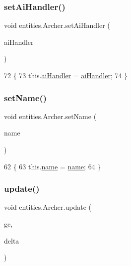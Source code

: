 \subsubsection{\texorpdfstring{set\+Ai\+Handler()}{setAiHandler()}}
{\footnotesize\ttfamily void entities.\+Archer.\+set\+Ai\+Handler (\begin{DoxyParamCaption}\item[{\mbox{\hyperlink{classentities_1_1_a_i_handler_basic}{A\+I\+Handler\+Basic}}}]{ai\+Handler }\end{DoxyParamCaption})\hspace{0.3cm}{\ttfamily [inline]}}


\begin{DoxyCode}
72                                                        \{
73         this.\mbox{\hyperlink{classentities_1_1_archer_a362254fb1ca99f07804647033ffe26d1}{aiHandler}} = \mbox{\hyperlink{classentities_1_1_archer_a362254fb1ca99f07804647033ffe26d1}{aiHandler}};
74     \}
\end{DoxyCode}
\mbox{\label{classentities_1_1_archer_a19c73121003b6704a0d082a51757ea91}} 
\subsubsection{\texorpdfstring{set\+Name()}{setName()}}
{\footnotesize\ttfamily void entities.\+Archer.\+set\+Name (\begin{DoxyParamCaption}\item[{String}]{name }\end{DoxyParamCaption})\hspace{0.3cm}{\ttfamily [inline]}}


\begin{DoxyCode}
62                                      \{
63         this.\mbox{\hyperlink{classentities_1_1_archer_a2c5680a0d628e5abbf69711d7df4d0b6}{name}} = \mbox{\hyperlink{classentities_1_1_archer_a2c5680a0d628e5abbf69711d7df4d0b6}{name}};
64     \}
\end{DoxyCode}
\mbox{\label{classentities_1_1_archer_ae4fadcd75edae2e4c9631fa1fe9b813c}} 
\subsubsection{\texorpdfstring{update()}{update()}}
{\footnotesize\ttfamily void entities.\+Archer.\+update (\begin{DoxyParamCaption}\item[{\mbox{\hyperlink{classorg_1_1newdawn_1_1slick_1_1_game_container}{Game\+Container}}}]{gc,  }\item[{long}]{delta }\end{DoxyParamCaption})\hspace{0.3cm}{\ttfamily [inline]}}


